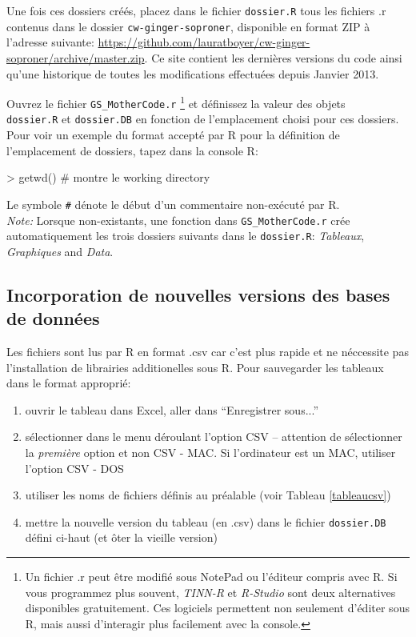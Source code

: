 \documentclass{article}
\begin{document}
     Une fois ces dossiers créés, placez dans le fichier
     \texttt{dossier.R} tous les fichiers .r contenus dans le dossier
     \texttt{cw-ginger-soproner}, disponible en format ZIP à l'adresse
     suivante:
     \url{https://github.com/lauratboyer/cw-ginger-soproner/archive/master.zip}. Ce
     site contient les dernières versions du code ainsi qu'une
     historique de toutes les modifications effectuées depuis Janvier 2013.

Ouvrez le fichier \texttt{GS\_MotherCode.r} \footnote{Un fichier .r
  peut être modifié sous NotePad ou l'éditeur
compris avec R. Si vous programmez plus souvent, \emph{TINN-R} et \emph{R-Studio}
sont deux alternatives disponibles gratuitement. Ces logiciels
permettent non seulement
d'éditer sous R, mais aussi d'interagir plus facilement avec la
console. } et définissez la valeur des objets \\ \texttt{dossier.R} et \texttt{dossier.DB}
en fonction de l'emplacement choisi pour ces dossiers.
Pour voir un exemple du format accepté par R pour la
  définition de l'emplacement de dossiers, tapez dans la console R:
\begin{Schunk}
\begin{Sinput}
> getwd() # montre le working directory
\end{Sinput}
\end{Schunk}
  \noindent Le symbole \texttt{\#} dénote le début d'un commentaire non-exécuté
par R.\\

\noindent \emph{Note:} Lorsque non-existants, une fonction dans \texttt{GS\_MotherCode.r} crée
automatiquement les trois dossiers
suivants dans le \texttt{dossier.R}: \emph{Tableaux},
\emph{Graphiques} and \emph{Data}. \\

\subsection{Incorporation de nouvelles versions des bases de données}
\label{nouvdb}
Les fichiers sont lus par R en format .csv car c'est plus rapide et
ne néccessite pas l'installation de librairies additionelles sous
R. Pour sauvegarder les tableaux dans le format approprié:

\begin{enumerate}
  \item ouvrir le tableau dans Excel, aller dans ``Enregistrer sous...''
  \item sélectionner dans le menu déroulant l'option CSV -- attention
    de sélectionner la \emph{première} option et non CSV - MAC. Si
    l'ordinateur est un MAC, utiliser l'option CSV - DOS
  \item utiliser les noms de fichiers définis au préalable (voir
    Tableau \ref{tableaucsv})
   \item mettre la nouvelle version du tableau (en .csv) dans le
    fichier \texttt{dossier.DB} défini ci-haut (et ôter la vieille
    version)
  \end{enumerate}
\end{document}
